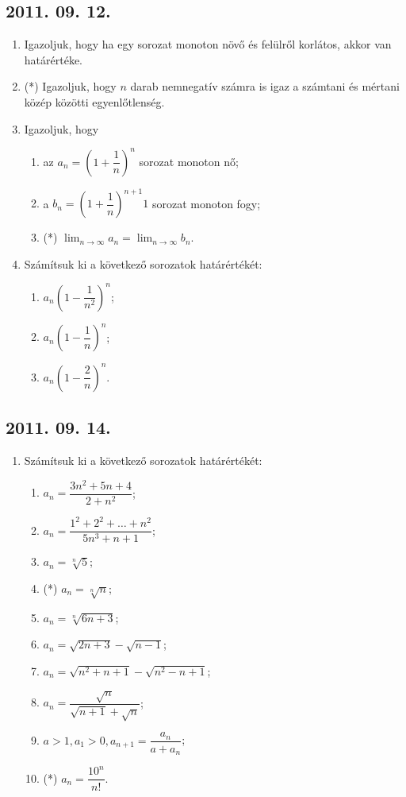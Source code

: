 \documentclass{article}
\newenvironment{abc}{\begin{enumerate}[label=\textit{\alph*})]}{\end{enumerate}}
\begin{document}
\subsection*{2011. 09. 12.}
\begin{enumerate}
\item Igazoljuk, hogy ha egy sorozat monoton növő és felülről korlátos, akkor van határértéke.
\item (*) Igazoljuk, hogy $n$ darab nemnegatív számra is igaz a számtani és mértani közép közötti egyenlőtlenség.
\item Igazoljuk, hogy
	\begin{abc}
	\item az $a_n= \left(1+\dfrac{1}{n}\right)^n$ sorozat monoton nő;
    \item a $b_n= \left(1+\dfrac{1}{n}\right)^{n+1}1$ sorozat monoton fogy;
    \item (*) $\displaystyle\lim_{n \to \infty} a_n= \displaystyle\lim_{n \to \infty} b_n$.
	\end{abc}

\item Számítsuk ki a következő sorozatok határértékét:
	\begin{abc}
	\item $a_n\left(1-\dfrac{1}{n^2}\right)^n$;
    \item $a_n\left(1-\dfrac{1}{n}\right)^n$;
    \item $a_n\left(1-\dfrac{2}{n}\right)^n$.
	\end{abc}
\end{enumerate}

\subsection*{2011. 09. 14.}
\begin{enumerate}
	\item Számítsuk ki a következő sorozatok határértékét:
	\begin{abc}
	\item $a_n=\dfrac{3n^2+5n+4}{2+n^2}$;
    \item $a_n=\dfrac{1^2+2^2+\ldots+n^2}{5n^3+n+1}$;
	\item $a_n=\sqrt[n]{5}$;
    \item (*) $a_n=\sqrt[n]{n}$;
    \item $a_n=\sqrt[n]{6n+3}$;
    \item $a_n=\sqrt{2n+3}-\sqrt{n-1}$;
    \item $a_n=\sqrt{n^2+n+1}-\sqrt{n^2-n+1}$;
    \item $a_n=\dfrac{\sqrt{n}}{\sqrt{n+1}+\sqrt{n}}$;
    \item $a>1, a_1>0, a_{n+1}=\dfrac{a_n}{a+a_n}$;
    \item (*) $a_n=\dfrac{10^n}{n!}$.
\end{abc}
\end{enumerate}
\end{document}
